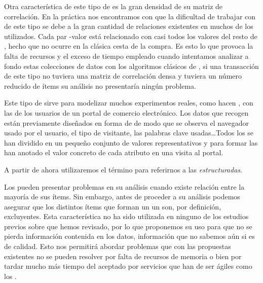 Otra característica de este tipo de \transacciones es la gran densidad de su matriz de correlación. En la práctica nos encontramos con que la dificultad de trabajar con \transacciones de este tipo se debe a la gran cantidad de relaciones existentes en muchos de los \datasets utilizados. Cada par \atributo-valor está relacionado con casi todos los valores del resto de \atributos, hecho que no ocurre en la clásica cesta de la compra. Es esto lo que provoca la falta de recursos y el exceso de tiempo empleado cuando intentamos analizar a fondo estas colecciones de datos con los algoritmos clásicos de \ARM, si una transacción de este tipo no tuviera una matriz de correlación densa y tuviera un número reducido de ítems su análisis no presentaría ningún problema.

Este tipo de \transacciones sirve para modelizar muchos experimentos reales, como hacen \cite{CarmonaRGallegoTorresBernalDelJesusGarcia-WUMtoImprovePortalDesign-2012}, con las \sns de los usuarios de un portal de comercio electrónico. Los datos que recogen están previamente diseñados en forma de \atributos de modo que se observa el navegador usado por el usuario, el tipo de visitante, las palabras clave usadas\ldots Todos los \atributos se han dividido en un pequeño conjunto de valores representativos y para formar las \transacciones han anotado el valor concreto de cada atributo en una visita al portal.

A partir de ahora utilizaremos el término \registro para referirnos a las \transacciones \emph{estructuradas}.

Los \registros pueden presentar problemas en su análisis cuando existe relación entre la mayoría de sus ítems. Sin embargo, antes de proceder a su análisis podemos asegurar que los distintos ítems que forman un un \atributo son, por definición, excluyentes. Esta característica no ha sido utilizada en ninguno de los estudios previos sobre \ARM que hemos revisado, por lo que proponemos su uso para que no se pierda información contenida en los datos, información que no sabemos aún si es de calidad. Esto nos permitirá abordar problemas que con las propuestas existentes no se pueden resolver por falta de recursos de memoria o bien por tardar mucho más tiempo del aceptado por servicios que han de ser ágiles como los \srs.

